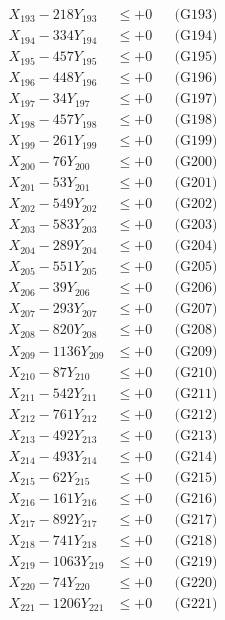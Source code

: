 \documentclass[a4paper,10pt]{article}
\begin{document}
{\begin{align}
X_{193} - 218Y_{193} &\leq +0 && \text{(G193)} \\
X_{194} - 334Y_{194} &\leq +0 && \text{(G194)} \\
X_{195} - 457Y_{195} &\leq +0 && \text{(G195)} \\
X_{196} - 448Y_{196} &\leq +0 && \text{(G196)} \\
X_{197} - 34Y_{197} &\leq +0 && \text{(G197)} \\
X_{198} - 457Y_{198} &\leq +0 && \text{(G198)} \\
X_{199} - 261Y_{199} &\leq +0 && \text{(G199)} \\
X_{200} - 76Y_{200} &\leq +0 && \text{(G200)} \\
\allowbreak
X_{201} - 53Y_{201} &\leq +0 && \text{(G201)} \\
X_{202} - 549Y_{202} &\leq +0 && \text{(G202)} \\
X_{203} - 583Y_{203} &\leq +0 && \text{(G203)} \\
X_{204} - 289Y_{204} &\leq +0 && \text{(G204)} \\
X_{205} - 551Y_{205} &\leq +0 && \text{(G205)} \\
X_{206} - 39Y_{206} &\leq +0 && \text{(G206)} \\
X_{207} - 293Y_{207} &\leq +0 && \text{(G207)} \\
X_{208} - 820Y_{208} &\leq +0 && \text{(G208)} \\
X_{209} - 1136Y_{209} &\leq +0 && \text{(G209)} \\
X_{210} - 87Y_{210} &\leq +0 && \text{(G210)} \\
\allowbreak
X_{211} - 542Y_{211} &\leq +0 && \text{(G211)} \\
X_{212} - 761Y_{212} &\leq +0 && \text{(G212)} \\
X_{213} - 492Y_{213} &\leq +0 && \text{(G213)} \\
X_{214} - 493Y_{214} &\leq +0 && \text{(G214)} \\
X_{215} - 62Y_{215} &\leq +0 && \text{(G215)} \\
X_{216} - 161Y_{216} &\leq +0 && \text{(G216)} \\
X_{217} - 892Y_{217} &\leq +0 && \text{(G217)} \\
X_{218} - 741Y_{218} &\leq +0 && \text{(G218)} \\
X_{219} - 1063Y_{219} &\leq +0 && \text{(G219)} \\
X_{220} - 74Y_{220} &\leq +0 && \text{(G220)} \\
\allowbreak
X_{221} - 1206Y_{221} &\leq +0 && \text{(G221)} \\

\end{align}}
\end{document}

